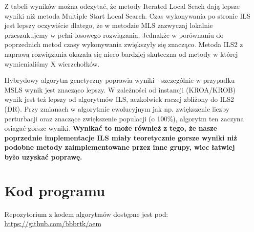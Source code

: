 \documentclass{article}
\begin{document}
Z tabeli wyników można odczytać, że metody Iterated Local Seach dają lepsze wyniki niż metoda Multiple Start Local Search. Czas wykonywania po stronie ILS jest lepszy oczywiście dlatego, że w metodzie MLS zazwyczaj lokalnie przeszukujemy w pełni losowego rozwiązania. Jednakże w porównaniu do poprzednich metod czasy wykonywania zwiększyły się znacząco. Metoda ILS2 z naprawą rozwiązania okazała się nieco bardziej skuteczna od metody w której wymienialiśmy X wierzchołków. 

Hybrydowy algorytm genetyczny poprawia wyniki - szczególnie w przypadku MSLS wynik jest znacząco lepszy. W zależności od instancji (KROA/KROB) wynik jest też lepszy od algorytmów ILS, aczkolwiek raczej zbliżony do ILS2 (DR). Przy zmianach w algorytmie ewolucyjnym jak np. zwiększenie liczby perturbacji oraz znaczące zwiększenie populacji (o 100\%), algorytm ten zaczyna osiagać gorsze wyniki. \textbf{Wynikać to może również z tego, że nasze poprzednie implementacje ILS miały teoretycznie gorsze wyniki niż podobne metody zaimplementowane przez inne grupy, wiec łatwiej było uzyskać poprawę.} 


\section{Kod programu}

    Repozytorium z kodem algorytmów dostępne jest pod: \url{https://github.com/bbbrtk/aem}
\end{document}

